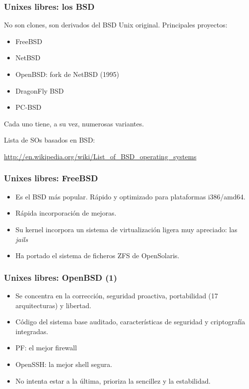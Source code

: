 \documentclass{beamer}
\begin{document}

\begin{frame}
\frametitle{Unixes libres: los BSD}

No son clones, son derivados del BSD Unix original. Principales proyectos:

\begin{itemize}
\item FreeBSD
\item NetBSD
\item OpenBSD: fork de NetBSD (1995)
\item DragonFly BSD
\item PC-BSD

\end{itemize}

Cada uno tiene, a su vez, numerosas variantes.

\pause

\begin{center}
Lista de SOs basados en BSD: 
\begin{small}
\url{http://en.wikipedia.org/wiki/List_of_BSD_operating_systems}
\end{small}
\end{center}

\end{frame}


\begin{frame}
\frametitle{Unixes libres: FreeBSD}

\begin{itemize}
\item Es el BSD más popular. Rápido y optimizado para plataformas i386/amd64.
\item Rápida incorporación de mejoras. 
\item Su kernel incorpora un sistema de virtualización ligera muy apreciado: las \textit{jails}
\item Ha portado el sistema de ficheros ZFS de OpenSolaris.
\end{itemize}

\end{frame}


\begin{frame}
\frametitle{Unixes libres: OpenBSD (1)}


\begin{itemize}
\item Se concentra en la corrección, seguridad proactiva, portabilidad (17 arquitecturas) y libertad.
\item Código del sistema base auditado, características de seguridad y criptografía integradas. 
\item PF: el mejor firewall
\item OpenSSH: la mejor shell segura.
\item No intenta estar a la última, prioriza la sencillez y la estabilidad.
\end{itemize}


\end{frame}
\end{document}
